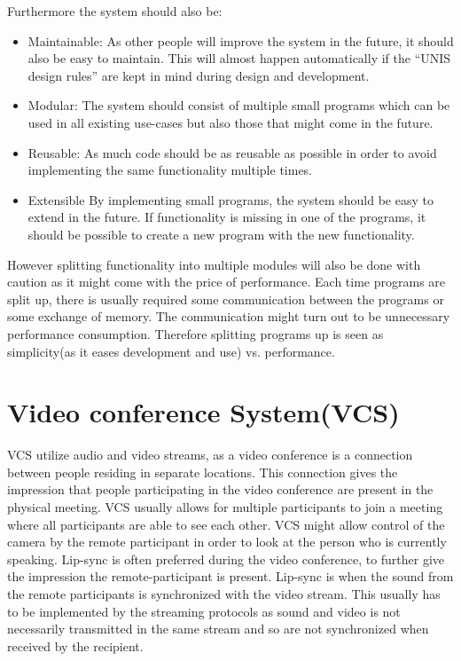
Furthermore the system should also be:

\begin{itemize}
	\item Maintainable:
As other people will improve the system in the future, it should also be easy to maintain. This will almost happen automatically if the ``UNIS design rules'' are kept in mind during design and development.
\item Modular:
The system should consist of multiple small programs which can be used in all existing use-cases but also those that might come in the future.
\item Reusable:
As much code should be as reusable as possible in order to avoid implementing the same functionality multiple times.
\item Extensible
    By implementing small programs, the system should be easy to extend in the future.
    If functionality is missing in one of the programs, it should be possible to create a new 
    program with the new functionality.
\end{itemize}

However splitting functionality into multiple modules will also be done with caution as it might come with the price of performance. Each time programs are split up, there is usually required some communication between the programs or some exchange of memory. The communication might turn out to be unnecessary performance consumption. Therefore splitting programs up is seen as simplicity(as it eases development and use) vs. performance.


\section{Video conference System(VCS)}
\ac{VCS} utilize audio and video streams, as a video conference is a connection between people residing in separate locations. This connection gives the impression that people participating in the video conference are present in the physical meeting. VCS usually allows for multiple participants to join a meeting where all participants are able to see each other. VCS might allow control of the camera by the remote participant in order to look at the person who is currently speaking. 
Lip-sync is often preferred during the video conference, to further give the impression the remote-participant is present. Lip-sync is when the sound from the remote participants is synchronized with the video stream. This usually has to be implemented by the streaming protocols as sound and video is not necessarily transmitted in the same stream and so are not synchronized when received by the recipient.

